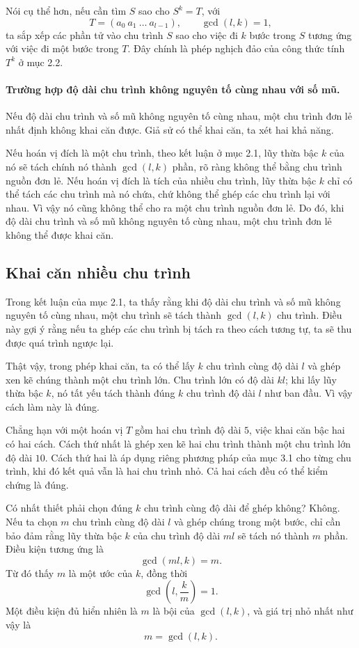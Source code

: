 \documentclass[11pt]{article}
\begin{document}
Nói cụ thể hơn, nếu cần tìm \(S\) sao cho \(S^k=T\), với
\[
  T=(a_0\ a_1\ \ldots\ a_{l-1}),\qquad \gcd(l,k)=1,
\]
ta sắp xếp các phần tử vào chu trình \(S\) sao cho việc đi \(k\) bước trong
\(S\) tương ứng với việc đi một bước trong \(T\). Đây chính là phép nghịch đảo
của công thức tính \(T^k\) ở mục 2.2.

\paragraph{Trường hợp độ dài chu trình không nguyên tố cùng nhau với số mũ.}
Nếu độ dài chu trình và số mũ không nguyên tố cùng nhau, một chu trình đơn lẻ
nhất định không khai căn được. Giả sử có thể khai căn, ta xét hai khả năng.

Nếu hoán vị đích là một chu trình, theo kết luận ở mục 2.1, lũy thừa bậc \(k\)
của nó sẽ tách chính nó thành \(\gcd(l,k)\) phần, rõ ràng không thể bằng chu
trình nguồn đơn lẻ. Nếu hoán vị đích là tích của nhiều chu trình, lũy thừa bậc
\(k\) chỉ có thể tách các chu trình mà nó chứa, chứ không thể ghép các chu
trình lại với nhau. Vì vậy nó cũng không thể cho ra một chu trình nguồn đơn
lẻ. Do đó, khi độ dài chu trình và số mũ không nguyên tố cùng nhau, một chu
trình đơn lẻ không thể được khai căn.

\subsection{Khai căn nhiều chu trình}

Trong kết luận của mục 2.1, ta thấy rằng khi độ dài chu trình và số mũ không
nguyên tố cùng nhau, một chu trình sẽ tách thành \(\gcd(l,k)\) chu trình. Điều
này gợi ý rằng nếu ta ghép các chu trình bị tách ra theo cách tương tự, ta sẽ
thu được quá trình ngược lại.

Thật vậy, trong phép khai căn, ta có thể lấy \(k\) chu trình cùng độ dài \(l\)
và ghép xen kẽ chúng thành một chu trình lớn. Chu trình lớn có độ dài \(kl\);
khi lấy lũy thừa bậc \(k\), nó tất yếu tách thành đúng \(k\) chu trình độ dài
\(l\) như ban đầu. Vì vậy cách làm này là đúng.

Chẳng hạn với một hoán vị \(T\) gồm hai chu trình độ dài \(5\), việc khai căn
bậc hai có hai cách. Cách thứ nhất là ghép xen kẽ hai chu trình thành một chu
trình lớn độ dài \(10\). Cách thứ hai là áp dụng riêng phương pháp của mục 3.1
cho từng chu trình, khi đó kết quả vẫn là hai chu trình nhỏ. Cả hai cách đều
có thể kiểm chứng là đúng.

Có nhất thiết phải chọn đúng \(k\) chu trình cùng độ dài để ghép không? Không.
Nếu ta chọn \(m\) chu trình cùng độ dài \(l\) và ghép chúng trong một bước, chỉ
cần bảo đảm rằng lũy thừa bậc \(k\) của chu trình độ dài \(ml\) sẽ tách nó
thành \(m\) phần. Điều kiện tương ứng là
\[
  \gcd(ml,k)=m.
\]
Từ đó thấy \(m\) là một ước của \(k\), đồng thời
\[
  \gcd\left(l,\frac{k}{m}\right)=1.
\]
Một điều kiện đủ hiển nhiên là \(m\) là bội của \(\gcd(l,k)\), và giá trị nhỏ
nhất như vậy là
\[
  m=\gcd(l,k).
\]
\end{document}
